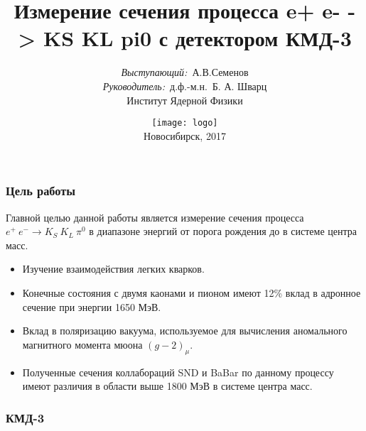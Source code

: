 \documentclass[14pt, hyperref = {colorlinks}]{beamer}
\title{\small{Измерение сечения процесса e+ e- -> KS KL pi0 с детектором КМД-3}}
\author{\small{%
\emph{Выступающий:}~А.В.Семенов\\%
\emph{Руководитель:}~д.ф.-м.н.~Б. А. Шварц}\\%
\vspace{30pt}%
Институт Ядерной Физики
\vspace{0pt}%
}
\date{\texttt{[image: logo]} \\
\vspace{20pt}%
\small{Новосибирск, 2017}}
\begin{document}

\small
\begin{frame}
\frametitle{Цель работы}\label{t1}
\begin{center}
 Главной целью данной работы является измерение сечения процесса {$e^+\:e^- \to K_{S}\:K_{L}\:\pi^0$} в диапазоне энергий от порога рождения  до  в системе центра масс.
\begin{itemize}
  \item Изучение взаимодействия легких кварков.
  \item Конечные состояния с двумя каонами и пионом имеют 12\% вклад в адронное сечение при энергии 1650 МэВ.
  \item Вклад в поляризацию вакуума, используемое для вычисления аномального магнитного момента мюона {$(g-2)_\mu$}.
  \item Полученные сечения коллабораций SND и BaBar по данному процессу имеют различия в области выше 1800 МэВ в системе центра масс.
\end{itemize}
\end{center}
\end{frame}


\begin{frame}
\frametitle{КМД-3}
\begin{figure}[h]
    \center{\texttt{[image: ]}}
\hfill
\end{figure}
\end{frame}
\end{document}
